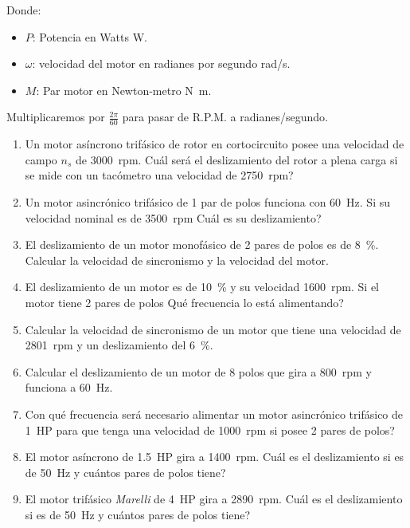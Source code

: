 \documentclass[../main]{subfiles}
\begin{document}
Donde:
\begin{itemize}
\item $P$: Potencia en Watts \unit{W}.
\item $\omega$: velocidad del motor en radianes por segundo \unit{rad/s}.
\item $M$: Par motor en Newton-metro \unit{N.m}.
\end{itemize}

Multiplicaremos por $\frac{2\pi}{60}$ para pasar de R.P.M. a radianes/segundo.

\begin{enumerate}
\item Un motor as\'incrono{} trif\'asico{} de rotor en cortocircuito posee una velocidad de campo $n_s$ de \qty{3000}{rpm}. \textquestiondown{}Cu\'al{} ser\'a{} el deslizamiento del rotor a plena carga si se mide con un tac\'ometro{} una velocidad de \qty{2750}{rpm}?
\item Un motor asincr\'onico{} trif\'asico{} de 1 par de polos funciona con \qty{60}{Hz}. Si su velocidad nominal es de \qty{3500}{rpm} \textquestiondown{}Cu\'al{} es su deslizamiento?
\item El deslizamiento de un motor monof\'asico{} de 2 pares de polos es de \qty{8}{\%}. Calcular la velocidad de sincronismo y la velocidad del motor.
\item El deslizamiento de un motor es de \qty{10}{\%} y su velocidad \qty{1600}{rpm}. Si el motor tiene 2 pares de polos \textquestiondown{}Qu\'e{} frecuencia lo est\'a{} alimentando?
\item Calcular la velocidad de sincronismo de un motor que tiene una velocidad de \qty{2801}{rpm} y un deslizamiento del \qty{6}{\%}.
\item Calcular el deslizamiento de un motor de 8 polos que gira a \qty{800}{rpm} y funciona a \qty{60}{Hz}.
\item \textquestiondown{}Con qu\'e{} frecuencia ser\'a{} necesario alimentar un motor asincr\'onico{} trif\'asico{} de \qty{1}{HP} para que tenga una velocidad de \qty{1000}{rpm} si posee 2 pares de polos?
\item El motor as\'incrono{} de \qty{1.5}{HP} gira a \qty{1400}{rpm}. \textquestiondown{}Cu\'al{} es el deslizamiento si es de \qty{50}{Hz} y cu\'antos{} pares de polos tiene?
\item El motor trif\'asico{} \emph{Marelli} de \qty{4}{HP} gira a \qty{2890}{rpm}. \textquestiondown{}Cu\'al{} es el deslizamiento si es de \qty{50}{Hz} y cu\'antos{} pares de polos tiene?

\end{enumerate}
\end{document}
